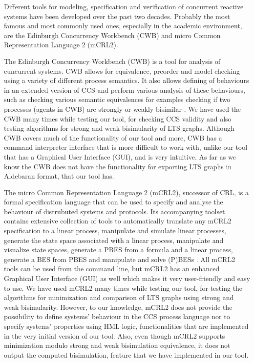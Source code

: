 Different tools for modeling, specification and verification of concurrent reactive systems have been developed over the past two decades. Probably the most famous and most commonly used ones, especially in the academic environment, are the Edinburgh Concurrency Workbench (CWB) and micro Common Representation Language 2 (mCRL2). 

The Edinburgh Concurrency Workbench (CWB) is a tool for analysis of cuncurrent systems. CWB allows for equivalence, preorder and model checking using a variety of different process semantics. It also allows defining of behaviours in an extended version of CCS and perform various analysis of these behaviours, such as checking various semantic equivalences for examples checking if two processes (agents in CWB) are strongly or weakly bisimilar \cite{CWB}. We have used the CWB many times while testing our tool, for checking CCS validity and also testing algorithms for strong and weak bisimularity of LTS graphs. Although CWB covers much of the functionality of our tool and more, CWB has a command interpreter interface that is more difficult to work with, unlike our tool that has a Graphical User Interface (GUI), and is very intuitive. As far as we know the CWB does not have the functionality for exporting LTS graphs in Aldebaran format, that our tool has. 

The micro Common Representation Language 2 (mCRL2), successor of CRL, is a formal specification language that can be used to specify and analyse the behaviour of distrubuted systems and protocols. Its accompanying toolset contains extensive collection of tools to automatically translate any mCRL2 specification to a linear process, manipulate and simulate linear processes, generate the state space associated with a linear process, manipulate and visualize state spaces, generate a PBES from a formula and a linear process, generate a BES from PBES and manipulate and solve (P)BESs \cite{mCRL2}. All mCRL2 tools can be used from the command line, but mCRL2 has an enhanced Graphical User Interface (GUI) as well which makes it very user-friendly and easy to use. We have used mCRL2 many times while testing our tool, for testing the algorithms for minimization and comparison of LTS graphs using strong and weak bisimularity. However, to our knowledge, mCRL2 does not provide the possibility to define systems' behaviour in the CCS process language nor to specify systems' properties using HML logic, functionalities that are implemented in the very initial version of our tool. Also, even though mCRL2 supports minimization modulo strong and weak bisimulation equivalence, it does not output the computed bisimulation, feature that we have implemented in our tool.  
 
